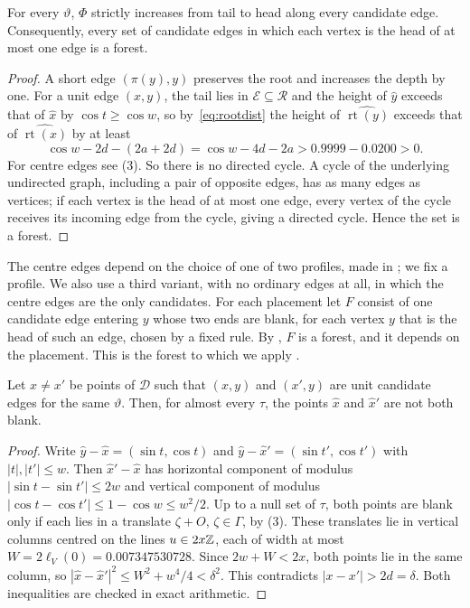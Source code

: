 \documentclass[11pt,colorlinks]{charlie}
\newcommand{\cR}{\mathcal{R}}
\newcommand{\cD}{\mathcal{D}}
\newcommand{\cE}{\mathcal{E}}
\begin{document}
\begin{lemma}\label{lem:acyclic}
For every $\vartheta$, $\Phi$ strictly increases from tail to head along every candidate edge. Consequently, every set of candidate edges in which each vertex is the head of at most one edge is a forest.
\end{lemma}

\begin{proof}
A short edge $(\pi(y),y)$ preserves the root and increases the depth by one. For a unit edge $(x,y)$, the tail lies in $\cE\subseteq\cR$ and the height of $\hat y$ exceeds that of $\hat x$ by $\cos t\ge\cos w$, so by~\eqref{eq:rootdist} the height of $\widehat{\operatorname{rt}(y)}$ exceeds that of $\widehat{\operatorname{rt}(x)}$ by at least
\[
 \cos w-2d-(2a+2d)=\cos w-4d-2a>0.9999-0.0200>0 .
\]
For centre edges see (3). So there is no directed cycle. A cycle of the underlying undirected graph, including a pair of opposite edges, has as many edges as vertices; if each vertex is the head of at most one edge, every vertex of the cycle receives its incoming edge from the cycle, giving a directed cycle. Hence the set is a forest.
\end{proof}

The centre edges depend on the choice of one of two profiles, made in ; we fix a profile. We also use a third variant, with no ordinary edges at all, in which the centre edges are the only candidates. For each placement let $F$ consist of one candidate edge entering $y$ whose two ends are blank, for each vertex $y$ that is the head of such an edge, chosen by a fixed rule. By , $F$ is a forest, and it depends on the placement. This is the forest to which we apply .

\begin{lemma}[Two tails in $\cD$]\label{lem:dtails}
Let $x\ne x'$ be points of $\cD$ such that $(x,y)$ and $(x',y)$ are unit candidate edges for the same $\vartheta$. Then, for almost every $\tau$, the points $\hat x$ and $\hat x'$ are not both blank.
\end{lemma}

\begin{proof}
Write $\hat y-\hat x=(\sin t,\cos t)$ and $\hat y-\hat x'=(\sin t',\cos t')$ with $|t|,|t'|\le w$. Then $\hat x'-\hat x$ has horizontal component of modulus $|\sin t-\sin t'|\le2w$ and vertical component of modulus $|\cos t-\cos t'|\le1-\cos w\le w^2/2$. Up to a null set of $\tau$, both points are blank only if each lies in a translate $\zeta+O$, $\zeta\in\Gamma$, by (3). These translates lie in vertical columns centred on the lines $u\in2x\mathbb{Z}$, each of width at most $W=2\ell_V(0)=0.007347530728$. Since $2w+W<2x$, both points lie in the same column, so $|\hat x-\hat x'|^2\le W^2+w^4/4<\delta^2$. This contradicts $|x-x'|>2d=\delta$. Both inequalities are checked in exact arithmetic.
\end{proof}
\end{document}

